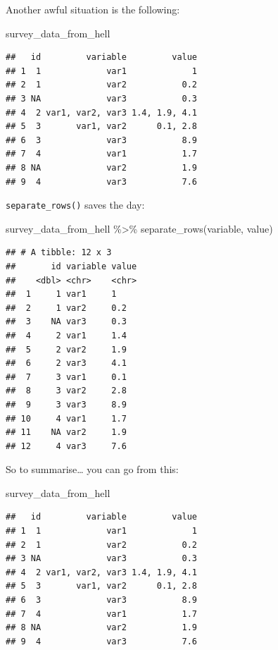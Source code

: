 \documentclass[
]{article}
\newenvironment{Shaded}{\begin{snugshade}}{\end{snugshade}}
\newcommand{\FunctionTok}[1]{\textcolor[rgb]{0.00,0.00,0.00}{#1}}
\newcommand{\NormalTok}[1]{#1}
\newcommand{\SpecialCharTok}[1]{\textcolor[rgb]{0.00,0.00,0.00}{#1}}
\begin{document}
Another awful situation is the following:

\begin{Shaded}
\begin{Highlighting}[]
\NormalTok{survey\_data\_from\_hell}
\end{Highlighting}
\end{Shaded}

\begin{verbatim}
##   id         variable         value
## 1  1             var1             1
## 2  1             var2           0.2
## 3 NA             var3           0.3
## 4  2 var1, var2, var3 1.4, 1.9, 4.1
## 5  3       var1, var2      0.1, 2.8
## 6  3             var3           8.9
## 7  4             var1           1.7
## 8 NA             var2           1.9
## 9  4             var3           7.6
\end{verbatim}

\texttt{separate\_rows()} saves the day:

\begin{Shaded}
\begin{Highlighting}[]
\NormalTok{survey\_data\_from\_hell }\SpecialCharTok{\%\textgreater{}\%}
    \FunctionTok{separate\_rows}\NormalTok{(variable, value)}
\end{Highlighting}
\end{Shaded}

\begin{verbatim}
## # A tibble: 12 x 3
##       id variable value
##    <dbl> <chr>    <chr>
##  1     1 var1     1    
##  2     1 var2     0.2  
##  3    NA var3     0.3  
##  4     2 var1     1.4  
##  5     2 var2     1.9  
##  6     2 var3     4.1  
##  7     3 var1     0.1  
##  8     3 var2     2.8  
##  9     3 var3     8.9  
## 10     4 var1     1.7  
## 11    NA var2     1.9  
## 12     4 var3     7.6
\end{verbatim}

So to summarise\ldots{} you can go from this:

\begin{Shaded}
\begin{Highlighting}[]
\NormalTok{survey\_data\_from\_hell}
\end{Highlighting}
\end{Shaded}

\begin{verbatim}
##   id         variable         value
## 1  1             var1             1
## 2  1             var2           0.2
## 3 NA             var3           0.3
## 4  2 var1, var2, var3 1.4, 1.9, 4.1
## 5  3       var1, var2      0.1, 2.8
## 6  3             var3           8.9
## 7  4             var1           1.7
## 8 NA             var2           1.9
## 9  4             var3           7.6
\end{verbatim}
\end{document}
